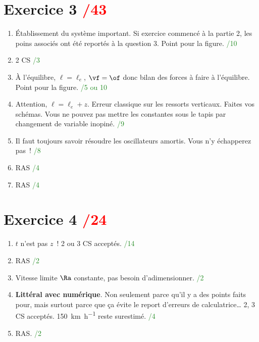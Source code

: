 \documentclass[a4paper, 10pt, final, garamond]{book}
\begin{document}
\begin{multicols}{2}
\section{Exercice 3 \hfill \textcolor{red}{/43}}
\begin{enumerate}
    \item Établissement du système important. Si exercice commencé à la partie
        2, les poins associés ont été reportés à la question 3. Point pour la
        figure. \hfill \textcolor{ForestGreen}{/10}
    \item 2 CS \hfill \textcolor{ForestGreen}{/3}
    \item À l'équilibre, $\ell = \ell_e$, $\vf = \of$ donc bilan des forces à
        faire à l'équilibre. Point pour la figure. \hfill
        \textcolor{ForestGreen}{/5 ou 10}
    \item Attention, $\ell = \ell_e + z$. Erreur classique sur les ressorts
        verticaux. Faites vos schémas. Vous ne pouvez pas mettre les constantes
        sous le tapis par changement de variable inopiné. \hfill
        \textcolor{ForestGreen}{/9}
    \item Il faut toujours savoir résoudre les oscillateurs amortis. Vous n'y
        échapperez pas~! \hfill \textcolor{ForestGreen}{/8}
    \item RAS \hfill \textcolor{ForestGreen}{/4}
    \item RAS \hfill \textcolor{ForestGreen}{/4}
\end{enumerate}
\columnbreak
\section{Exercice 4 \hfill \textcolor{red}{/24}}
\begin{enumerate}
    \item $t$ n'est pas $z$~! 2 ou 3 CS acceptés. \hfill
        \textcolor{ForestGreen}{/14}
    \item RAS \hfill \textcolor{ForestGreen}{/2}
    \item Vitesse limite $\Ra$ constante, pas besoin d'adimensionner. \hfill
        \textcolor{ForestGreen}{/2}
    \item \textbf{Littéral avec numérique}. Non seulement parce qu'il y a des
        points faits pour, mais surtout parce que ça évite le report d'erreurs
        de calculatrice… 2, 3 CS acceptés. \SI{150}{km.h^{-1}} reste surestimé.
        \hfill \textcolor{ForestGreen}{/4}
    \item RAS. \hfill \textcolor{ForestGreen}{/2}
\end{enumerate}
\end{multicols}
\end{document}
